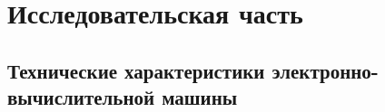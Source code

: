 \chapter{Исследовательская часть}

\section{Технические характеристики электронно-вычислительной машины}

\clearpage
